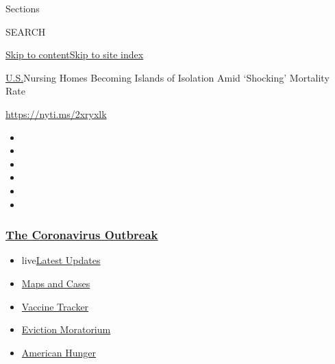 Sections

SEARCH

\protect\hyperlink{site-content}{Skip to
content}\protect\hyperlink{site-index}{Skip to site index}

\href{/section/us}{U.S.}\textbar{}Nursing Homes Becoming Islands of
Isolation Amid `Shocking' Mortality Rate

\url{https://nyti.ms/2xryxlk}

\begin{itemize}
\item
\item
\item
\item
\item
\item
\end{itemize}

\hypertarget{the-coronavirus-outbreak}{%
\subsubsection{\texorpdfstring{\href{https://www.nytimes3xbfgragh.onion/news-event/coronavirus?name=styln-coronavirus-national\&region=TOP_BANNER\&block=storyline_menu_recirc\&action=click\&pgtype=Article\&impression_id=ab630080-f1dd-11ea-8805-df335ac33130\&variant=undefined}{The
Coronavirus
Outbreak}}{The Coronavirus Outbreak}}\label{the-coronavirus-outbreak}}

\begin{itemize}
\tightlist
\item
  live\href{https://www.nytimes3xbfgragh.onion/2020/09/08/world/covid-19-coronavirus.html?name=styln-coronavirus-national\&region=TOP_BANNER\&block=storyline_menu_recirc\&action=click\&pgtype=Article\&impression_id=ab632790-f1dd-11ea-8805-df335ac33130\&variant=undefined}{Latest
  Updates}
\item
  \href{https://www.nytimes3xbfgragh.onion/interactive/2020/us/coronavirus-us-cases.html?name=styln-coronavirus-national\&region=TOP_BANNER\&block=storyline_menu_recirc\&action=click\&pgtype=Article\&impression_id=ab632791-f1dd-11ea-8805-df335ac33130\&variant=undefined}{Maps
  and Cases}
\item
  \href{https://www.nytimes3xbfgragh.onion/interactive/2020/science/coronavirus-vaccine-tracker.html?name=styln-coronavirus-national\&region=TOP_BANNER\&block=storyline_menu_recirc\&action=click\&pgtype=Article\&impression_id=ab632792-f1dd-11ea-8805-df335ac33130\&variant=undefined}{Vaccine
  Tracker}
\item
  \href{https://www.nytimes3xbfgragh.onion/2020/09/02/your-money/eviction-moratorium-covid.html?name=styln-coronavirus-national\&region=TOP_BANNER\&block=storyline_menu_recirc\&action=click\&pgtype=Article\&impression_id=ab634ea0-f1dd-11ea-8805-df335ac33130\&variant=undefined}{Eviction
  Moratorium}
\item
  \href{https://www.nytimes3xbfgragh.onion/interactive/2020/09/02/magazine/food-insecurity-hunger-us.html?name=styln-coronavirus-national\&region=TOP_BANNER\&block=storyline_menu_recirc\&action=click\&pgtype=Article\&impression_id=ab634ea1-f1dd-11ea-8805-df335ac33130\&variant=undefined}{American
  Hunger}
\end{itemize}

